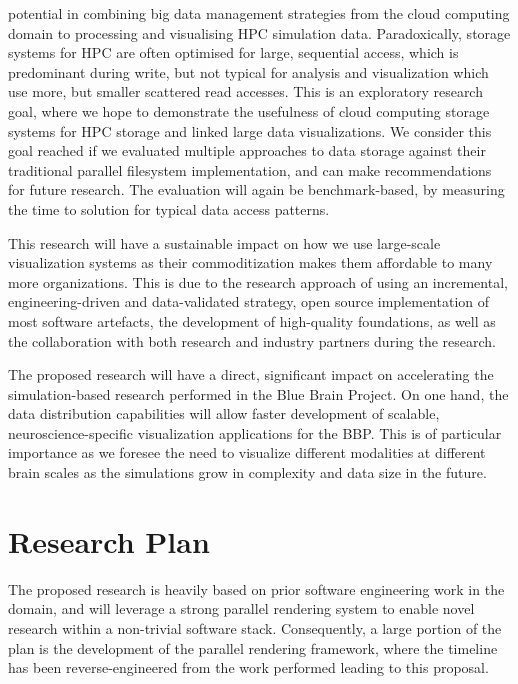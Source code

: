 \begin{compactdesc}
potential in combining big data management strategies from the cloud computing
domain to processing and visualising HPC simulation data. Paradoxically, storage
systems for HPC are often optimised for large, sequential access, which is
predominant during write, but not typical for analysis and visualization which
use more, but smaller scattered read accesses. This is an exploratory research
goal, where we hope to demonstrate the usefulness of cloud computing storage
systems for HPC storage and linked large data visualizations. We consider this
goal reached if we evaluated multiple approaches to data storage against their
traditional parallel filesystem implementation, and can make recommendations for
future research. The evaluation will again be benchmark-based, by measuring the
time to solution for typical data access patterns.
\end{compactdesc}

This research will have a sustainable impact on how we use large-scale
visualization systems as their commoditization makes them affordable to many
more organizations. This is due to the research approach of using an
incremental, engineering-driven and data-validated strategy, open source
implementation of most software artefacts, the development of high-quality
foundations, as well as the collaboration with both research and industry
partners during the research.

The proposed research will have a direct, significant impact on accelerating the
simulation-based research performed in the Blue Brain Project. On one hand, the
data distribution capabilities will allow faster development of scalable,
neuroscience-specific visualization applications for the BBP. This is of
particular importance as we foresee the need to visualize different modalities
at different brain scales as the simulations grow in complexity and data size in
the future.

\chapter{Research Plan\label{sPlan}}

The proposed research is heavily based on prior software engineering work in the
domain, and will leverage a strong parallel rendering system to enable novel
research within a non-trivial software stack. Consequently, a large portion of
the plan is the development of the parallel rendering framework, where the
timeline has been reverse-engineered from the work performed leading to this
proposal.

